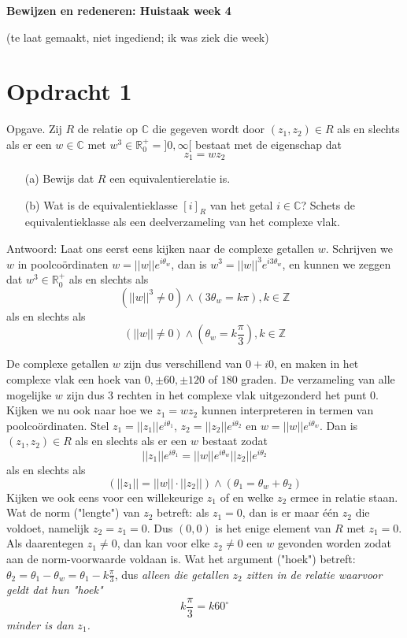 \documentclass[a4paper]{article}
\begin{document}
\begin{center}
{\Large\bf Bewijzen en redeneren: Huistaak week 4} \par\vspace{.5em}
{(te laat gemaakt, niet ingediend; ik was ziek die week)}
\end{center}


\section*{Opdracht 1}


Opgave. Zij $R$ de relatie op $\mathbb{C}$  die gegeven wordt door $(z_1, z_2) \in R$ als en slechts als er een $w \in \mathbb{C}$ met $w^3 \in \mathbb{R}_0^+ = ] 0, \infty [ $  bestaat met de eigenschap dat 
\[ z_1 = w z_2 \] 

\begin{enumerate}
\item[(a)] Bewijs dat $R$ een equivalentierelatie is.
\item[(b)] Wat is de equivalentieklasse $[i]_R$ van het getal $i \in \mathbb{C}$? Schets de equivalentieklasse als een deelverzameling van het complexe vlak.
\end{enumerate}


Antwoord: 
Laat ons eerst eens kijken naar de complexe getallen $w$. Schrijven we $w$ in poolco\"ordinaten $w = ||w|| e^{i\theta_w}$, dan is $w^3 = ||w||^3 e^{i3\theta_w}$, en kunnen we zeggen dat $w^3 \in \mathbb{R}_0^+$ als en slechts als 
\[
( ||w||^3 \neq 0 ) \land  (3\theta_w = k\pi) , k\in \mathbb{Z} 
\]
als en slechts als 
\[
( ||w|| \neq 0 ) \land  (\theta_w = k\frac{\pi}{3}) , k\in \mathbb{Z} 
\]

De complexe getallen $w$ zijn dus verschillend van $0+i0$, en maken in het complexe vlak een hoek van $0, \pm 60, \pm 120$ of $180 $ graden. De verzameling van alle mogelijke $w$ zijn dus $3$ rechten in het complexe vlak uitgezonderd het punt $0$. 
Kijken we nu ook naar hoe we $z_1 = w z_2$ kunnen interpreteren in termen van poolco\"ordinaten. Stel $z_1 = ||z_1|| e^{i\theta_1}$, $z_2 = ||z_2|| e^{i\theta_2}$ en $w = ||w|| e^{i\theta_w}$. Dan is  $(z_1, z_2) \in R$ als en slechts als er een $w$ bestaat zodat
\[
||z_1|| e^{i\theta_1} = ||w|| e^{i\theta_w} ||z_2|| e^{i\theta_2} 
\]
als en slechts als 
\[
( ||z_1||  = ||w|| \cdot ||z_2|| ) \land ( \theta_1 = \theta_w + \theta_2 ) 
\]
Kijken we ook eens voor een willekeurige $z_1$ of en welke $z_2$ ermee in relatie staan. Wat de norm ("lengte") van $z_2$ betreft: als $z_1 = 0$, dan is er maar \'e\'en $z_2$ die voldoet, namelijk $z_2=z_1=0$. Dus $(0,0)$ is het enige element van $R$ met $z_1 = 0$. 
Als daarentegen $z_1 \neq 0$, dan kan voor elke $z_2 \neq 0$ een $w$ gevonden worden zodat aan de norm-voorwaarde voldaan is. Wat het argument ("hoek") betreft: $\theta_2 = \theta_1 - \theta_w = \theta_1 - k\frac{\pi}{3}$, dus \emph{alleen die getallen $z_2$ zitten in de relatie waarvoor geldt dat hun "hoek" }
\[ k\frac{\pi}{3} = k60^{\circ} \] 
\emph{minder is dan $z_1$.}
\end{document}
